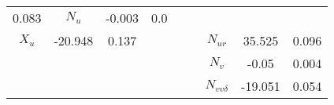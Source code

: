 \begin{table}[!htb]
\begin{tabular}{|c|c|c|c|c|c|c|c|c|}
0.083
&

\( N_{u} \)
&

-0.003
&

0.0
\\


\( X_{u} \)
&

-20.948
&

0.137
&&&&

\( N_{ur} \)
&

35.525
&

0.096
\\
&&&&&&

\( N_{v} \)
&

-0.05
&

0.004
\\
&&&&&&

\( N_{vv\delta} \)
&

-19.051
&

0.054
\\
\hline
\end{tabular}

\end{table}

